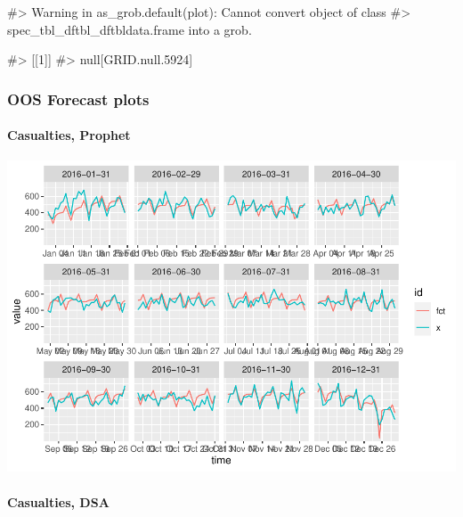 \begin{Schunk}
\begin{Soutput}
#> Warning in as_grob.default(plot): Cannot convert object of class
#> spec_tbl_dftbl_dftbldata.frame into a grob.
\end{Soutput}
\begin{Soutput}
#> [[1]]
#> null[GRID.null.5924]
\end{Soutput}
\end{Schunk}

\hypertarget{oos-forecast-plots}{%
\subsubsection{OOS Forecast plots}\label{oos-forecast-plots}}

\hypertarget{casualties-prophet-1}{%
\paragraph{Casualties, Prophet}\label{casualties-prophet-1}}

\begin{Schunk}

\includegraphics[width=1\linewidth]{overview_files/figure-latex/unnamed-chunk-8-1} \end{Schunk}

\hypertarget{casualties-dsa-1}{%
\paragraph{Casualties, DSA}\label{casualties-dsa-1}}

